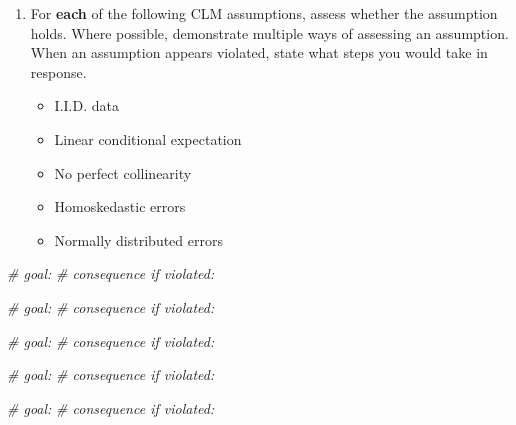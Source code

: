 \documentclass[
]{book}
\newenvironment{Shaded}{\begin{snugshade}}{\end{snugshade}}
\newcommand{\CommentTok}[1]{\textcolor[rgb]{0.56,0.35,0.01}{\textit{#1}}}
\providecommand{\tightlist}{%
  \setlength{\itemsep}{0pt}\setlength{\parskip}{0pt}}
\theoremstyle{definition}
\theoremstyle{definition}
\theoremstyle{definition}
\theoremstyle{definition}
\theoremstyle{remark}
\begin{document}
\begin{enumerate}
\def\labelenumi{\arabic{enumi}.}
\setcounter{enumi}{1}
\tightlist
\item
  For \textbf{each} of the following CLM assumptions, assess whether the assumption holds. Where possible, demonstrate multiple ways of assessing an assumption. When an assumption appears violated, state what steps you would take in response.

  \begin{itemize}
  \tightlist
  \item
    I.I.D. data
  \item
    Linear conditional expectation
  \item
    No perfect collinearity
  \item
    Homoskedastic errors
  \item
    Normally distributed errors
  \end{itemize}
\end{enumerate}

\begin{Shaded}
\begin{Highlighting}[]
\CommentTok{\# goal:}
\CommentTok{\# consequence if violated:}
\end{Highlighting}
\end{Shaded}

\begin{Shaded}
\begin{Highlighting}[]
\CommentTok{\# goal:}
\CommentTok{\# consequence if violated:}
\end{Highlighting}
\end{Shaded}

\begin{Shaded}
\begin{Highlighting}[]
\CommentTok{\# goal:}
\CommentTok{\# consequence if violated:}
\end{Highlighting}
\end{Shaded}

\begin{Shaded}
\begin{Highlighting}[]
\CommentTok{\# goal:}
\CommentTok{\# consequence if violated:}
\end{Highlighting}
\end{Shaded}

\begin{Shaded}
\begin{Highlighting}[]
\CommentTok{\# goal:}
\CommentTok{\# consequence if violated:}
\end{Highlighting}
\end{Shaded}
\end{document}
